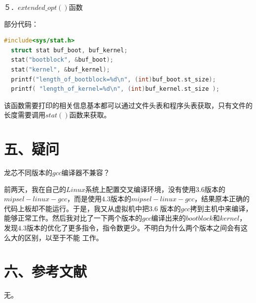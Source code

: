 \documentclass[UTF8,noindent]{ctexart}
\begin{document}
５．$extended\_opt()$函数

部分代码：
\begin{lstlisting}[language=c]
  #include<sys/stat.h>
  struct stat buf_boot, buf_kernel;
  stat("bootblock", &buf_boot);
  stat("kernel", &buf_kernel);
  printf("length_of_bootblock=%d\n", (int)buf_boot.st_size);
  printf( "length_of_kernel=%d\n", (int)buf_kernel.st_size );
\end{lstlisting}
该函数需要打印的相关信息基本都可以通过文件头表和程序头表获取，只有文件的长度需要调用$stat()$函数来获取。

\section*{五、疑问}
龙芯不同版本的$gcc$编译器不兼容？

前两天，我在自己的$Linux$系统上配置交叉编译环境，没有使用$3.6$版本的$mipsel-linux-gcc$，而是使用$4.3$版本的$mipsel-linux-gcc$，结果原本正确的代码上板却不能运行。于是，我又从虚拟机中把$3.6$
版本的$gcc$拷到主机中来编译，能够正常工作。然后我对比了一下两个版本的$gcc$编译出来的$bootblock$和$kernel$，发现$4.3$版本的优化了更多指令，指令数更少。不明白为什么两个版本之间会有这么大的区别，以至于不能
工作。

\section*{六、参考文献}

无。
\end{document}
